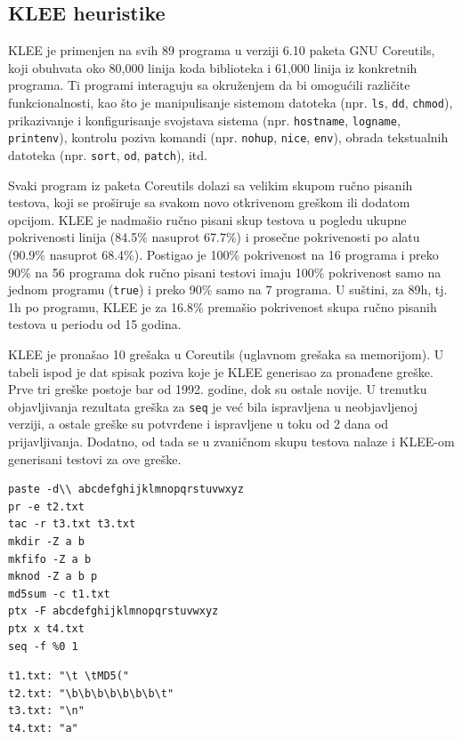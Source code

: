 \subsection{KLEE heuristike}\label{klee-heuristike}

KLEE je primenjen na svih 89 programa u verziji 6.10 paketa GNU Coreutils, koji obuhvata oko 80,000 linija koda biblioteka i 61,000 linija iz konkretnih programa. Ti programi interaguju sa okruženjem da bi omogućili različite funkcionalnosti, kao što je manipulisanje sistemom datoteka (npr. \texttt{ls}, \texttt{dd}, \texttt{chmod}), prikazivanje i konfigurisanje svojstava sistema (npr. \texttt{hostname}, \texttt{logname}, \texttt{printenv}), kontrolu poziva komandi (npr. \texttt{nohup}, \texttt{nice}, \texttt{env}), obrada tekstualnih datoteka (npr. \texttt{sort}, \texttt{od}, \texttt{patch}), itd.

Svaki program iz paketa Coreutils dolazi sa velikim skupom ručno pisanih testova, koji se proširuje sa svakom novo otkrivenom greškom ili dodatom opcijom. KLEE je nadmašio ručno pisani skup testova u pogledu ukupne pokrivenosti linija (84.5\% nasuprot 67.7\%) i prosečne pokrivenosti po alatu (90.9\% nasuprot 68.4\%). Postigao je 100\% pokrivenost na 16 programa i preko 90\% na 56 programa dok ručno pisani testovi imaju 100\% pokrivenost samo na jednom programu (\texttt{true}) i preko 90\% samo na 7 programa. U suštini, za 89h, tj. 1h po programu, KLEE je za 16.8\% premašio pokrivenost skupa ručno pisanih testova u periodu od 15 godina.

KLEE je pronašao 10 grešaka u Coreutils (uglavnom grešaka sa memorijom). U tabeli ispod je dat spisak poziva koje je KLEE generisao za pronađene greške. Prve tri greške postoje bar od 1992. godine, dok su ostale novije. U trenutku objavljivanja rezultata greška za \texttt{seq} je već bila ispravljena u neobjavljenoj verziji, a ostale greške su potvrđene i ispravljene u toku od 2 dana od prijavljivanja. Dodatno, od tada se u zvaničnom skupu testova nalaze i KLEE-om generisani testovi za ove greške.

\begin{verbatim}
paste -d\\ abcdefghijklmnopqrstuvwxyz
pr -e t2.txt
tac -r t3.txt t3.txt
mkdir -Z a b
mkfifo -Z a b
mknod -Z a b p
md5sum -c t1.txt
ptx -F abcdefghijklmnopqrstuvwxyz
ptx x t4.txt
seq -f %0 1
\end{verbatim}

\begin{verbatim}
t1.txt: "\t \tMD5("
t2.txt: "\b\b\b\b\b\b\b\t"
t3.txt: "\n"
t4.txt: "a"
\end{verbatim}

